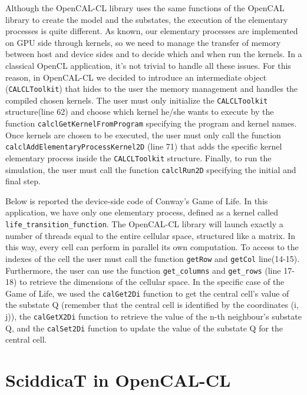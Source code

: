 Although the OpenCAL-CL library uses the same functions of the OpenCAL
library to create the model and the substates, the execution of the
elementary processes is quite different. As known, our elementary
processes are implemented on GPU side through kernels, so we need to
manage the transfer of memory between host and device sides and to
decide which and when run the kernels. In a classical OpenCL
application, it's not trivial to handle all these issues. For this
reason, in OpenCAL-CL we decided to introduce an intermediate object
(\verb'CALCLToolkit') that hides to the user the memory management and
handles the compiled chosen kernels. The user must only initialize the
\verb'CALCLToolkit' structure(line 62) and choose which kernel he/she
wants to execute by the function \verb'calclGetKernelFromProgram'
specifying the program and kernel names. Once kernels are chosen to be
executed, the user must only call the function
\verb'calclAddElementaryProcessKernel2D' (line 71) that adds the
specific kernel elementary process inside the \verb'CALCLToolkit'
structure. Finally, to run the simulation, the user must call the
function \verb'calclRun2D' specifying the initial and final step.

Below is reported the device-side code of Conway's Game of Life.  In
this application, we have only one elementary process, defined as a
kernel called \verb'life_transition_function'. The OpenCAL-CL library
will launch exactly a number of threads equal to the entire cellular
space, structured like a matrix. In this way, every cell can perform
in parallel its own computation. To access to the indexes of the cell
the user must call the function \verb'getRow' and \verb'getCol'
line(14-15). Furthermore, the user can use the function
\verb'get_columns' and \verb'get_rows' (line 17-18) to retrieve the
dimensions of the cellular space.  In the specific case of the Game of
Life, we used the \verb'calGet2Di' function to get the central cell’s
value of the substate Q (remember that the central cell is identified
by the coordinates (i, j)), the \verb'calGetX2Di' function to retrieve
the value of the n-th neighbour’s substate Q, and the \verb'calSet2Di'
function to update the value of the substate Q for the central cell.



\section{SciddicaT in OpenCAL-CL}

